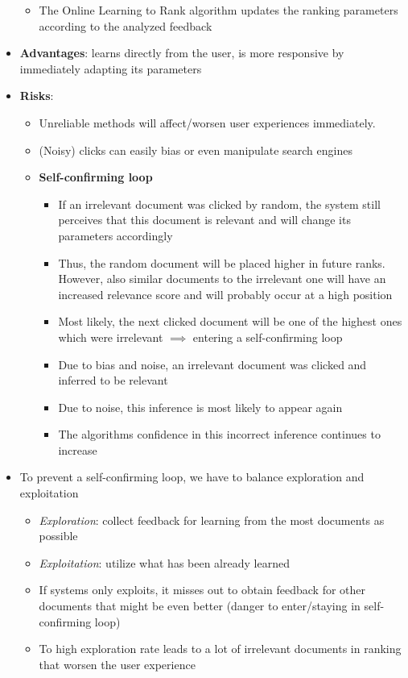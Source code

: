 \begin{itemize}
\begin{itemize}
		\item The Online Learning to Rank algorithm updates the ranking parameters according to the analyzed feedback
	\end{itemize}
	\item \textbf{Advantages}: learns directly from the user, is more responsive by immediately adapting its parameters
	\item \textbf{Risks}:
	\begin{itemize}
		\item Unreliable methods will affect/worsen user experiences immediately.
		\item (Noisy) clicks can easily bias or even manipulate search engines
		\item \textbf{Self-confirming loop}
		\begin{itemize}
			\item If an irrelevant document was clicked by random, the system still perceives that this document is relevant and will change its parameters accordingly
			\item Thus, the random document will be placed higher in future ranks. However, also similar documents to the irrelevant one will have an increased relevance score and will probably occur at a high position
			\item Most likely, the next clicked document will be one of the highest ones which were irrelevant $\implies$ entering a self-confirming loop
			\item Due to bias and noise, an irrelevant document was clicked and inferred to be relevant
			\item Due to noise, this inference is most likely to appear again
			\item The algorithms confidence in this incorrect inference continues to increase
		\end{itemize}
	\end{itemize}
	\item To prevent a self-confirming loop, we have to balance exploration and exploitation
	\begin{itemize}
		\item \textit{Exploration}: collect feedback for learning from the most documents as possible
		\item \textit{Exploitation}: utilize what has been already learned 
		\item If systems only exploits, it misses out to obtain feedback for other documents that might be even better (danger to enter/staying in self-confirming loop)
		\item To high exploration rate leads to a lot of irrelevant documents in ranking that worsen the user experience 
	\end{itemize}
\end{itemize}
